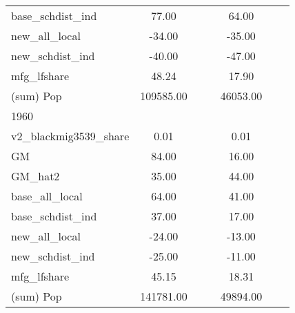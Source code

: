 \begin{table}[htbp]
\begin{tabular}{l*{2}{ccc}}
base\_schdist\_ind    &       77.00&            &            &       64.00&            &            \\
new\_all\_local       &      -34.00&            &            &      -35.00&            &            \\
new\_schdist\_ind     &      -40.00&            &            &      -47.00&            &            \\
mfg\_lfshare         &       48.24&            &            &       17.90&            &            \\
(sum) Pop           &   109585.00&            &            &    46053.00&            &            \\
\midrule
1960                &            &            &            &            &            &            \\
v2\_blackmig3539\_share&        0.01&            &            &        0.01&            &            \\
GM                  &       84.00&            &            &       16.00&            &            \\
GM\_hat2             &       35.00&            &            &       44.00&            &            \\
base\_all\_local      &       64.00&            &            &       41.00&            &            \\
base\_schdist\_ind    &       37.00&            &            &       17.00&            &            \\
new\_all\_local       &      -24.00&            &            &      -13.00&            &            \\
new\_schdist\_ind     &      -25.00&            &            &      -11.00&            &            \\
mfg\_lfshare         &       45.15&            &            &       18.31&            &            \\
(sum) Pop           &   141781.00&            &            &    49894.00&            &            \\
\bottomrule
\end{tabular}
\end{table}
